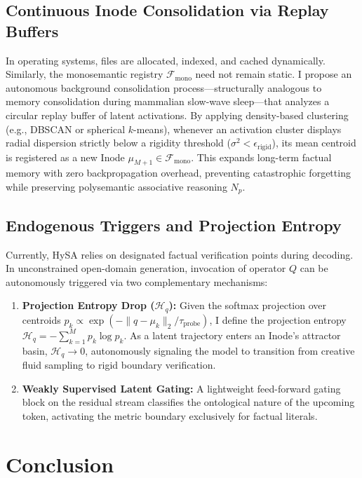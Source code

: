 \documentclass[10pt,twocolumn]{article}
\theoremstyle{definition}
\begin{document}
\subsection{Continuous Inode Consolidation via Replay Buffers}
In operating systems, files are allocated, indexed, and cached dynamically. Similarly, the monosemantic registry $\mathcal{F}_{\mathrm{mono}}$ need not remain static. I propose an autonomous background consolidation process---structurally analogous to memory consolidation during mammalian slow-wave sleep---that analyzes a circular replay buffer of latent activations. By applying density-based clustering (e.g., DBSCAN or spherical $k$-means), whenever an activation cluster displays radial dispersion strictly below a rigidity threshold ($\sigma^2 < \epsilon_{\mathrm{rigid}}$), its mean centroid is registered as a new Inode $\mu_{M+1} \in \mathcal{F}_{\mathrm{mono}}$. This expands long-term factual memory with zero backpropagation overhead, preventing catastrophic forgetting while preserving polysemantic associative reasoning $N_p$.

\subsection{Endogenous Triggers and Projection Entropy}
Currently, HySA relies on designated factual verification points during decoding. In unconstrained open-domain generation, invocation of operator $Q$ can be autonomously triggered via two complementary mechanisms:
\begin{enumerate}[leftmargin=*, itemsep=2.0pt]
    \item \textbf{Projection Entropy Drop ($\mathcal{H}_q$):} Given the softmax projection over centroids $p_k \propto \exp(-\|q - \mu_k\|_2 / \tau_{\mathrm{probe}})$, I define the projection entropy $\mathcal{H}_q = -\sum_{k=1}^M p_k \log p_k$. As a latent trajectory enters an Inode's attractor basin, $\mathcal{H}_q \to 0$, autonomously signaling the model to transition from creative fluid sampling to rigid boundary verification.
    \item \textbf{Weakly Supervised Latent Gating:} A lightweight feed-forward gating block on the residual stream classifies the ontological nature of the upcoming token, activating the metric boundary exclusively for factual literals.
\end{enumerate}

\section{Conclusion}
\end{document}
